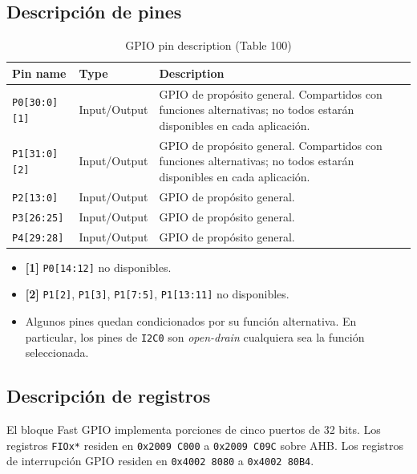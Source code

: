 \subsection{Descripción de pines}
\begin{table}[H]
  \centering
  \small
  \renewcommand{\arraystretch}{1.15}
  \setlength{\tabcolsep}{4pt}
  \caption{GPIO pin description (Table 100)}
  \begin{tabularx}{0.96\textwidth}{|>{\raggedright\arraybackslash}p{}|>{\raggedright\arraybackslash}p{}|>{\raggedright\arraybackslash}X|}
    \hline
    \textbf{Pin name} & \textbf{Type} & \textbf{Description} \\
    \hline
    \texttt{P0[30:0][1]} & Input/Output & GPIO de propósito general. Compartidos con funciones alternativas; no todos estarán disponibles en cada aplicación. \\
    \hline
    \texttt{P1[31:0][2]} & Input/Output & GPIO de propósito general. Compartidos con funciones alternativas; no todos estarán disponibles en cada aplicación. \\
    \hline
    \texttt{P2[13:0]} & Input/Output & GPIO de propósito general. \\
    \hline
    \texttt{P3[26:25]} & Input/Output & GPIO de propósito general. \\
    \hline
    \texttt{P4[29:28]} & Input/Output & GPIO de propósito general. \\
    \hline
  \end{tabularx}
\end{table}

\begin{itemize}
  \item \textbf{[1]} \texttt{P0[14:12]} no disponibles.
  \item \textbf{[2]} \texttt{P1[2]}, \texttt{P1[3]}, \texttt{P1[7:5]}, \texttt{P1[13:11]} no disponibles.
  \item Algunos pines quedan condicionados por su función alternativa. En particular, los pines de \texttt{I2C0} son \textit{open-drain} cualquiera sea la función seleccionada.
\end{itemize}

\subsection{Descripción de registros}
El bloque Fast GPIO implementa porciones de cinco puertos de 32 bits. Los registros \texttt{FIOx*} residen en \texttt{0x2009 C000} a \texttt{0x2009 C09C} sobre AHB. Los registros de interrupción GPIO residen en \texttt{0x4002 8080} a \texttt{0x4002 80B4}.

